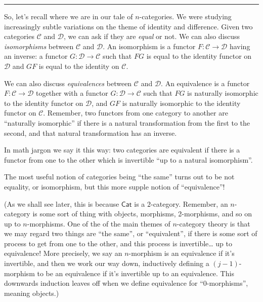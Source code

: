 \documentclass{article}
\begin{document}
\begin{center}\rule{0.5\linewidth}{0.5pt}\end{center}

So, let's recall where we are in our tale of \(n\)-categories. We were
studying increasingly subtle variations on the theme of identity and
difference. Given two categories \(\mathcal{C}\) and \(\mathcal{D}\), we
can ask if they are \emph{equal} or not. We can also discuss
\emph{isomorphisms} between \(\mathcal{C}\) and \(\mathcal{D}\). An
isomorphism is a functor \(F\colon\mathcal{C}\to\mathcal{D}\) having an
inverse: a functor \(G\colon\mathcal{D}\to\mathcal{C}\) such that \(FG\)
is equal to the identity functor on \(\mathcal{D}\) and \(GF\) is equal
to the identity on \(\mathcal{C}\).

We can also discuss \emph{equivalences} between \(\mathcal{C}\) and
\(\mathcal{D}\). An equivalence is a functor
\(F\colon\mathcal{C}\to\mathcal{D}\) together with a functor
\(G\colon\mathcal{D}\to\mathcal{C}\) such that \(FG\) is naturally
isomorphic to the identity functor on \(\mathcal{D}\), and \(GF\) is
naturally isomorphic to the identity functor on \(\mathcal{C}\).
Remember, two functors from one category to another are ``naturally
isomorphic'' if there is a natural transformation from the first to the
second, and that natural transformation has an inverse.

In math jargon we say it this way: two categories are equivalent if
there is a functor from one to the other which is invertible ``up to a
natural isomorphism''.

The most useful notion of categories being ``the same'' turns out to be
not equality, or isomorphism, but this more supple notion of
``equivalence''!

(As we shall see later, this is because \(\mathsf{Cat}\) is a
\(2\)-category. Remember, an \(n\)-category is some sort of thing with
objects, morphisms, 2-morphisms, and so on up to \(n\)-morphisms. One of
the of the main themes of \(n\)-category theory is that we may regard
two things are ``the same'', or ``equivalent'', if there is some sort of
process to get from one to the other, and this process is
invertible\ldots{} up to equivalence! More precisely, we say an
\(n\)-morphism is an equivalence if it's invertible, and then we work
our way down, inductively defining a \((j-1)\)-morphism to be an
equivalence if it's invertible up to an equivalence. This downwards
induction leaves off when we define equivalence for ``0-morphisms'',
meaning objects.)
\end{document}
